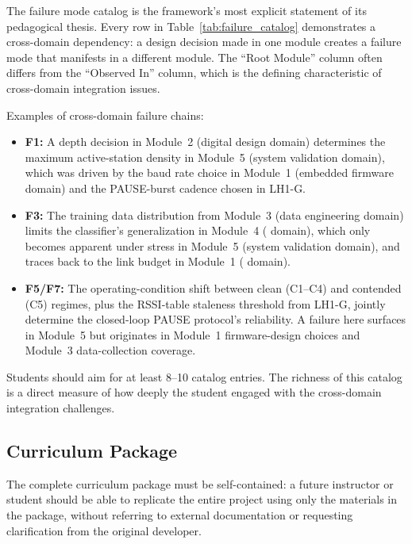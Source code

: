 \documentclass[11pt,letterpaper]{article}
\begin{document}
	\begin{tcolorbox}[infobox={Design Principle: Failures as Cross-Domain Dependencies}]
		The failure mode catalog is the framework's most explicit statement of its pedagogical thesis. Every row in Table~\ref{tab:failure_catalog} demonstrates a cross-domain dependency: a design decision made in one module creates a failure mode that manifests in a different module. The ``Root Module'' column often differs from the ``Observed In'' column, which is the defining characteristic of cross-domain integration issues.

		Examples of cross-domain failure chains:
		\begin{itemize}
			\item \textbf{F1:} A \FIFO{} depth decision in Module~2 (digital design domain) determines the maximum active-station density in Module~5 (system validation domain), which was driven by the \UART{} baud rate choice in Module~1 (embedded firmware domain) and the PAUSE-burst cadence chosen in LH1-G.
			\item \textbf{F3:} The training data distribution from Module~3 (data engineering domain) limits the classifier's generalization in Module~4 (\ML{} domain), which only becomes apparent under stress in Module~5 (system validation domain), and traces back to the link budget in Module~1 (\RF{} domain).
			\item \textbf{F5/F7:} The operating-condition shift between clean (C1--C4) and contended (C5) regimes, plus the RSSI-table staleness threshold from LH1-G, jointly determine the closed-loop PAUSE protocol's reliability. A failure here surfaces in Module~5 but originates in Module~1 firmware-design choices and Module~3 data-collection coverage.
		\end{itemize}
		Students should aim for at least 8--10 catalog entries. The richness of this catalog is a direct measure of how deeply the student engaged with the cross-domain integration challenges.
	\end{tcolorbox}

	\subsection{Curriculum Package}

	The complete curriculum package must be self-contained: a future instructor or student should be able to replicate the entire project using only the materials in the package, without referring to external documentation or requesting clarification from the original developer.
\end{document}
